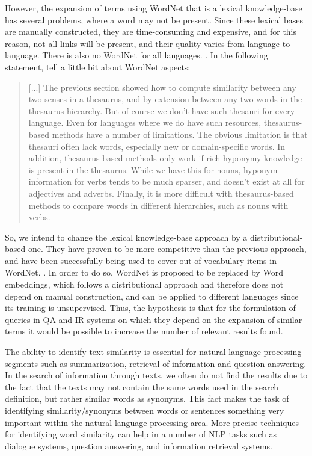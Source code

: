 However, the expansion of terms using WordNet that is a lexical knowledge-base has several problems, where a word may not be present. Since these lexical bases are manually constructed, they are time-consuming and expensive, and for this reason, not all links will be present, and their quality varies from language to language. There is also no WordNet for all languages. \cite{Leeuwenberga2016}. In the following statement,  tell a little bit about WordNet aspects:
\begin{quote}
    [...]
    The previous section showed how to compute similarity between any two senses in a thesaurus, and by extension between any two words in the thesaurus hierarchy. But of course we don't have such thesauri for every language. Even for languages where we do have such resources, thesaurus-based methods have a number of limitations. The obvious limitation is that thesauri often lack words, especially new or domain-specific words. In addition, thesaurus-based methods only work if rich hyponymy knowledge is present in the thesaurus. While we have this for nouns, hyponym information for verbs tends to be much sparser, and doesn't exist at all for adjectives and adverbs. Finally, it is more difficult with thesaurus-based methods to compare words in different hierarchies, such as nouns with verbs.
\end{quote}

So, we intend to change the lexical knowledge-base approach by a distributional-based one. They have proven to be more competitive than the previous approach, and have been successfully being used to cover out-of-vocabulary items in WordNet. \cite{gonccalo2018distributional, Agirre2009}.
In order to do so, WordNet is proposed to be replaced by Word embeddings, which follows a distributional approach and therefore does not depend on manual construction, and can be applied to different languages since its training is unsupervised. Thus, the hypothesis is that for the formulation of queries in QA and IR systems on which they depend on the expansion of similar terms it would be possible to increase the number of relevant results found.

The ability to identify text similarity is essential for natural language processing segments such as summarization, retrieval of information and question answering. In the search of information through texts, we often do not find the results due to the fact that the texts may not contain the same words used in the search definition, but rather similar words as synonyms. This fact makes the task of identifying similarity/synonyms between words or sentences something very important within the natural language processing area. More precise techniques for identifying word similarity can help in a number of NLP tasks such as dialogue systems, question answering, and information retrieval systems. \cite{gonccalo2018distributional, Pilehvar2013, Agirre2009, Islam2007ApplicationsOC}

